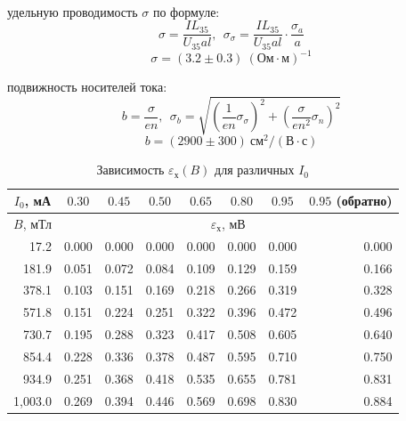 \documentclass{article}
\begin{document}
~

    удельную проводимость $\sigma$ по формуле:
   $$ \sigma = \frac{IL_{35}}{U_{35}al},~~ \sigma_{\sigma} = \frac{IL_{35}}{U_{35}al} \cdot \frac{\sigma_a}{a} $$
   $$ \sigma = (3.2 \pm 0.3)~ (\text{Ом$\cdot$м})^{-1} $$


    подвижность носителей тока:
   $$ b = \frac{\sigma}{en},~~ \sigma_b = \sqrt{\left(\frac{1}{en}\sigma_\sigma\right)^2 + \left(\frac{\sigma}{en^2}\sigma_n\right)^2} $$
   $$ b = (2900 \pm 300)~ \text{см}^2 / (\text{В} \cdot \text{с}) $$
   \begin{table}
   \begin{center}
   \caption{Зависимость $\varepsilon_{\text{х}}(B)$ для различных $I_0$}
   \label{exb1}
   \begin{tabular}{|*{8}{r|}}
   \hline 
   \multicolumn{1}{|c}{$I_0$, мА} & \multicolumn{1}{|c}{$0.30$} & \multicolumn{1}{|c}{$0.45$} & \multicolumn{1}{|c}{$0.50$} & 
   \multicolumn{1}{|c}{$0.65$} & \multicolumn{1}{|c}{$0.80$} & \multicolumn{1}{|c}{$0.95$} & \multicolumn{1}{|c|}{$0.95$ (обратно)} \\ \hline
   \multicolumn{1}{|c}{$B$, мТл} & \multicolumn{7}{|c|}{$\varepsilon_{\text{х}}$, мВ} \\ \hline 
   17.2 & 0.000 & 0.000 & 0.000 & 0.000 & 0.000 & 0.000 & 0.000 \\ \hline 
   181.9 & 0.051 & 0.072 & 0.084 & 0.109 & 0.129 & 0.159 & 0.166 \\ \hline 
   378.1 & 0.103 & 0.151 & 0.169 & 0.218 & 0.266 & 0.319 & 0.328 \\ \hline 
   571.8 & 0.151 & 0.224 & 0.251 & 0.322 & 0.396 & 0.472 & 0.496 \\ \hline 
   730.7 & 0.195 & 0.288 & 0.323 & 0.417 & 0.508 & 0.605 & 0.640 \\ \hline 
   854.4 & 0.228 & 0.336 & 0.378 & 0.487 & 0.595 & 0.710 & 0.750 \\ \hline 
   934.9 & 0.251 & 0.368 & 0.418 & 0.535 & 0.655 & 0.781 & 0.831 \\ \hline 
   1,003.0 & 0.269 & 0.394 & 0.446 & 0.569 & 0.698 & 0.830 & 0.884 \\ \hline 
   \end{tabular}
   \end{center} 
   \end{table} 
\end{document}

